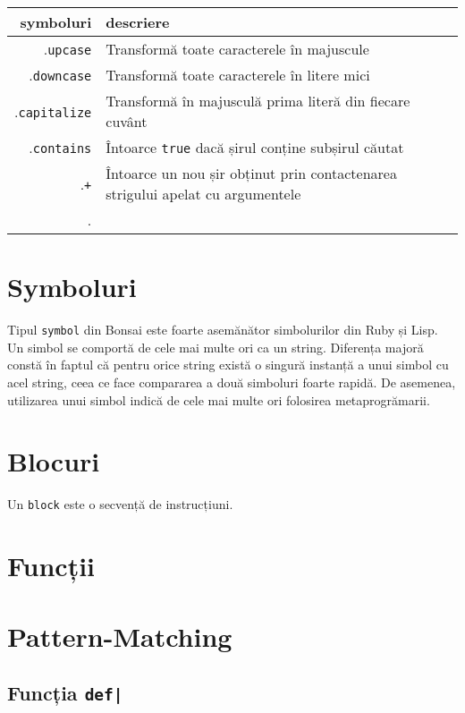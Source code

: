 \documentclass[12pt,a4paper]{memoir}
\begin{document}
\begin{tabular} { | r | l | }
  \hline
  symboluri & descriere \\
  \hline
  .\texttt{upcase} & Transformă toate caracterele în majuscule \\
  .\texttt{downcase} & Transformă toate caracterele în litere mici \\
  .\texttt{capitalize} & Transformă în majusculă prima literă din fiecare cuvânt \\
  .\texttt{contains} & Întoarce \texttt{true} dacă șirul conține subșirul căutat \\
  .\texttt{+} & Întoarce un nou șir obținut prin contactenarea strigului apelat cu argumentele \\
  .\texttt{} &  \\
  \hline
\end{tabular}

\section{Symboluri}

Tipul \texttt{symbol} din Bonsai este foarte asemănător simbolurilor din Ruby\cite{ruby_symbols} și Lisp\cite{clhs_symbols}. Un simbol se comportă de cele mai multe ori ca un string. Diferența majoră constă în faptul că pentru orice string există o singură instanță a unui simbol cu acel string, ceea ce face compararea a două simboluri foarte rapidă. De asemenea, utilizarea unui simbol indică de cele mai multe ori folosirea metaprogrămarii.

\section{Blocuri}

Un \texttt{block} este o secvență de instrucțiuni.


\section{Funcții}


\section{Pattern-Matching}

\subsection{Funcția \texttt{def|}}
\end{document}
